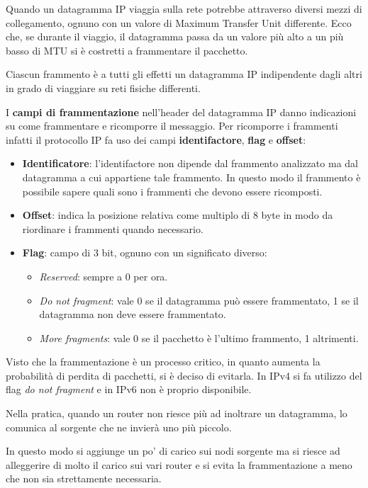 Quando un datagramma IP viaggia sulla rete potrebbe attraverso diversi 
mezzi di collegamento, ognuno con un valore di Maximum Transfer Unit
differente. Ecco che, se durante il viaggio, il datagramma passa da un
valore più alto a un più basso di MTU si è costretti a frammentare il
pacchetto.

Ciascun frammento è a tutti gli effetti un datagramma IP indipendente
dagli altri in grado di viaggiare su reti fisiche differenti.

I \textbf{campi di frammentazione} nell'header del datagramma IP danno 
indicazioni su come frammentare e ricomporre il messaggio. Per
ricomporre i frammenti infatti il protocollo IP fa uso dei campi 
\textbf{identifactore}, \textbf{flag} e \textbf{offset}:
\begin{itemize}
	\item \textbf{Identificatore}: l'identifactore non dipende dal 
		frammento analizzato ma dal datagramma a cui appartiene tale
		frammento. In questo modo il frammento è possibile sapere quali
		sono i frammenti che devono essere ricomposti.
	\item \textbf{Offset}: indica la posizione relativa come multiplo 
		di 8 byte in modo da riordinare i frammenti quando necessario.
	\item \textbf{Flag}: campo di 3 bit, ognuno con un significato
		diverso:
		\begin{itemize}
			\item \emph{Reserved}: sempre a 0 per ora.
			\item \emph{Do not fragment}: vale 0 se il datagramma può 
				essere frammentato, 1 se il datagramma non deve essere
				frammentato.
			\item \emph{More fragments}: vale 0 se il pacchetto è
				l'ultimo frammento, 1 altrimenti.
		\end{itemize}
\end{itemize}
Visto che la frammentazione è un processo critico, in quanto aumenta 
la probabilità di perdita di pacchetti, si è deciso di evitarla. In
IPv4 si fa utilizzo del flag \emph{do not fragment} e in IPv6 non è
proprio disponibile.

Nella pratica, quando un router non riesce più ad inoltrare un 
datagramma, lo comunica al sorgente che ne invierà uno più piccolo.

In questo modo si aggiunge un po' di carico sui nodi sorgente ma si
riesce ad alleggerire di molto il carico sui vari router e si evita 
la frammentazione a meno che non sia strettamente necessaria.

